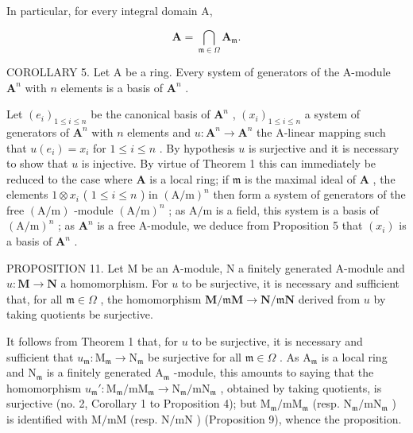 In particular, for every integral domain A,

\[
\mathbf {A} = \bigcap_ {\mathfrak {m} \in \Omega} \mathbf {A} _ {\mathfrak {m}}.\tag{2}
\]

COROLLARY 5. Let A be a ring. Every system of generators of the A-module \(\mathbf{A}^n\) with \(n\) elements is a basis of \(\mathbf{A}^n\) .

Let \((e_i)_{1\leqslant i\leqslant n}\) be the canonical basis of \(\mathbf{A}^n\) , \((x_i)_{1\leqslant i\leqslant n}\) a system of generators of \(\mathbf{A}^n\) with \(n\) elements and \(u\colon \mathbf{A}^n\to \mathbf{A}^n\) the A-linear mapping such that \(u(e_i) = x_i\) for \(1\leqslant i\leqslant n\) . By hypothesis \(u\) is surjective and it is necessary to show that \(u\) is injective. By virtue of Theorem 1 this can immediately be reduced to the case where \(\mathbf{A}\) is a local ring; if \(\mathfrak{m}\) is the maximal ideal of \(\mathbf{A}\) , the elements \(1\otimes x_i\) ( \(1\leqslant i\leqslant n\) ) in \((\mathrm{A / m})^n\) then form a system of generators of the free \((\mathrm{A / m})\) -module \((\mathrm{A / m})^n\) ; as \(\mathrm{A / m}\) is a field, this system is a basis of \((\mathrm{A / m})^n\) ; as \(\mathbf{A}^n\) is a free A-module, we deduce from Proposition 5 that \((x_i)\) is a basis of \(\mathbf{A}^n\) .

PROPOSITION 11. Let M be an A-module, N a finitely generated A-module and \(u: \mathbf{M} \to \mathbf{N}\) a homomorphism. For \(u\) to be surjective, it is necessary and sufficient that, for all \(\mathfrak{m} \in \Omega\) , the homomorphism \(\mathbf{M} / \mathfrak{m}\mathbf{M} \to \mathbf{N} / \mathfrak{m}\mathbf{N}\) derived from \(u\) by taking quotients be surjective.

It follows from Theorem 1 that, for \(u\) to be surjective, it is necessary and sufficient that \(u_{\mathfrak{m}}: \mathrm{M}_{\mathfrak{m}} \to \mathrm{N}_{\mathfrak{m}}\) be surjective for all \(\mathfrak{m} \in \Omega\) . As \(\mathrm{A}_{\mathfrak{m}}\) is a local ring and \(\mathrm{N}_{\mathfrak{m}}\) is a finitely generated \(\mathrm{A}_{\mathfrak{m}}\) -module, this amounts to saying that the homomorphism \(u_{\mathfrak{m}}': \mathrm{M}_{\mathfrak{m}} / \mathrm{mM}_{\mathfrak{m}} \to \mathrm{N}_{\mathfrak{m}} / \mathrm{mN}_{\mathfrak{m}}\) , obtained by taking quotients, is surjective (no. 2, Corollary 1 to Proposition 4); but \(\mathrm{M}_{\mathfrak{m}} / \mathrm{mM}_{\mathfrak{m}}\) (resp. \(\mathrm{N}_{\mathfrak{m}} / \mathrm{mN}_{\mathfrak{m}}\) ) is identified with \(\mathrm{M} / \mathrm{mM}\) (resp. \(\mathrm{N} / \mathrm{mN}\) ) (Proposition 9), whence the proposition.

